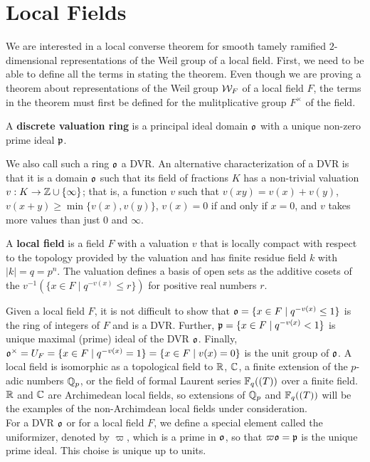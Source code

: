 \section{Local Fields}
\label{sec:local-fields}
We are interested in a local converse theorem for smooth tamely ramified $2$-dimensional representations of the Weil group of a local field.
First, we need to be able to define all the terms in stating the theorem.
Even though we are proving a theorem about representations of the Weil group $\mathcal{W}_F$ of a local field $F$, the terms in the theorem must first be defined for the mulitplicative group $F^\times$ of the field.
\begin{defn}
  A \textbf{discrete valuation ring} is a principal ideal domain $\mathfrak{o}$ with a unique non-zero prime ideal $\mathfrak{p}$.
\end{defn}
We also call such a ring $\mathfrak{o}$ a DVR.
An alternative characterization of a DVR is that it is a domain $\mathfrak{o}$ such that its field of fractions $K$ has a non-trivial valuation $v : K \to \mathbb{Z} \cup \{ \infty \}$; that is, a function $v$ such that $v(xy) = v(x) + v(y)$, $v(x+y) \geq \min \{v(x),v(y)\}$, $v(x) = 0$ if and only if $x = 0$, and $v$ takes more values than just $0$ and $\infty$.
\begin{defn}
  A \textbf{local field} is a field $F$ with a valuation $v$ that is locally compact with respect to the topology provided by the valuation and has finite residue field $k$ with $|k| = q = p^n$.
  The valuation defines a basis of open sets as the additive cosets of the $v^{-1}(\{x \in F \mid q^{-v(x)} \leq r\})$ for positive real numbers $r$.
\end{defn}
Given a local field $F$, it is not difficult to show that $\mathfrak{o} = \{x \in F \mid q^{-v(x)} \leq 1\}$ is the ring of integers of $F$ and is a DVR.
Further, $\mathfrak{p} = \{x \in F \mid q^{-v(x)} < 1\}$ is unique maximal (prime) ideal of the DVR $\mathfrak{o}$.
Finally, $\mathfrak{o}^\times = U_F = \{x \in F \mid q^{-v(x)} = 1\} = \{x \in F \mid v(x) = 0\}$ is the unit group of $\mathfrak{o}$.
A local field is isomorphic as a topological field to $\mathbb{R}$, $\mathbb{C}$, a finite extension of the $p$-adic numbers $\mathbb{Q}_p$, or the field of formal Laurent series $\mathbb{F}_q((T))$ over a finite field.
$\mathbb{R}$ and $\mathbb{C}$ are Archimedean local fields, so extensions of $\mathbb{Q}_p$ and $\mathbb{F}_q((T))$ will be the examples of the non-Archimdean local fields under consideration.
\\

For a DVR $\mathfrak{o}$ or for a local field $F$, we define a special element called the uniformizer, denoted by $\varpi$, which is a prime in $\mathfrak{o}$, so that $\varpi \mathfrak{o} = \mathfrak{p}$ is the unique prime ideal.
This choise is unique up to units.

